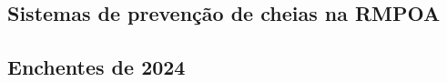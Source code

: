 

\subsection{Sistemas de prevenção de cheias na RMPOA}
\lipsum[1-8]



\subsection{Enchentes de 2024}
\lipsum[1-6]

